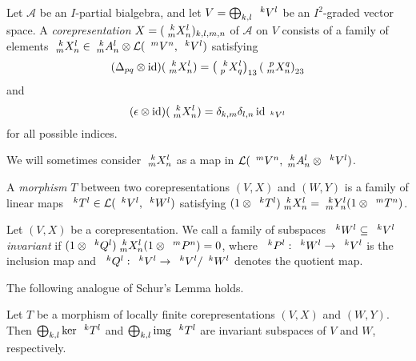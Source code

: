\begin{Def} Let $\mathscr{A}$ be an $I$-partial bialgebra, and let $V=\bigoplus_{k,l} \Gru{V}{k}{l}$ be an $I^{2}$-graded vector space.
A \emph{corepresentation}  $X=(\Gr{X}{k}{l}{m}{n})_{k,l,m,n}$ of $\mathscr{A}$ on $V$ consists of a family of elements 
  $\Gr{X}{k}{l}{m}{n} \in \Gr{A}{k}{l}{m}{n} \otimes
  \mathcal{L}(\Gru{V}{m}{n},\Gru{V}{k}{l})$
  satisfying
  \begin{align} \label{eq:rep-delta}
    (\Delta_{pq} \otimes \id)(\Gr{X}{k}{l}{m}{n}) =
    \left(\Gr{X}{k}{l}{p}{q}\right)_{13}\left(\Gr{X}{p}{q}{m}{n}\right)_{23}
  \end{align}
and   \[(\epsilon \otimes
    \id)(\Gr{X}{k}{l}{m}{n})=\delta_{k,m}\delta_{l,n}\id_{\Gru{V}{k}{l}}\] 
for all possible indices.
\end{Def} %

We will sometimes consider $\Gr{X}{k}{l}{m}{n}$ as a map in $\mathcal{L}(\Gru{V}{m}{n},\Gr{A}{k}{l}{m}{n}\otimes \Gru{V}{k}{l})$. %

\begin{Def}\label{DefMorphism} A \emph{morphism} $T$ between two corepresentations
$(V,X)$ and $(W,Y)$ is a family of linear maps
$\Gru{T}{k}{l} \in
\mathcal{L}(\Gru{V}{k}{l},\Gru{W}{k}{l})$
satisfying $(1 \otimes \Gru{T}{k}{l})\Gr{X}{k}{l}{m}{n} =
\Gr{Y}{k}{l}{m}{n}(1 \otimes \Gru{T}{m}{n})$.
\end{Def}

\begin{Def} Let $(V,X)$ be a
corepresentation. We call a family of subspaces
$\Gru{W}{k}{l} \subseteq \Gru{V}{k}{l}$
\emph{invariant} if $(1\otimes \Gru{Q}{k}{l})\Gr{X}{k}{l}{m}{n}(1 \otimes \Gru{P}{m}{n}) =0$,
where $\Gru{P}{k}{l}:\Gru{W}{k}{l}\to\Gru{V}{k}{l}$ is the inclusion map and $\Gru{Q}{k}{l}:\Gru{V}{k}{l}\to\Gru{V}{k}{l}/\Gru{W}{k}{l}$
denotes the quotient map.
\end{Def}

The following analogue of Schur's Lemma holds.

\begin{Lem} Let $T$ be a morphism
of locally finite corepresentations $(V,X)$ and
$(W,Y)$. Then $ \bigoplus_{k,l} \ker \Gru{T}{k}{l}$ and
$\bigoplus_{k,l} \img \Gru{T}{k}{l}$ are invariant subspaces of
$V$ and $W$, respectively.
\end{Lem} 

